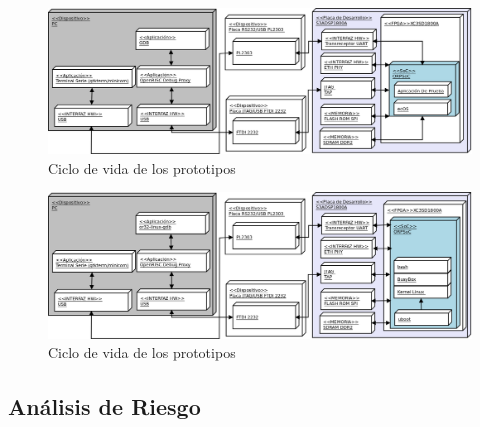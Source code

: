 \documentclass[conference]{IEEEtran}
\newcommand{\ScaleA}{1.0} %
\begin{document}
\begin{figure}[t] 
  \centerline{\includegraphics[width=\ScaleA\columnwidth]{figures_sources/ecos}}%
    \caption{Ciclo de vida de los prototipos}
    \label{fig:pro3enc} 
\end{figure}

\begin{figure}[t] 
  \centerline{\includegraphics[width=\ScaleA\columnwidth]{figures_sources/proto4}}%
    \caption{Ciclo de vida de los prototipos}
    \label{fig:pro3enc} 
\end{figure}

\subsection{Análisis de Riesgo} %
\end{document}

